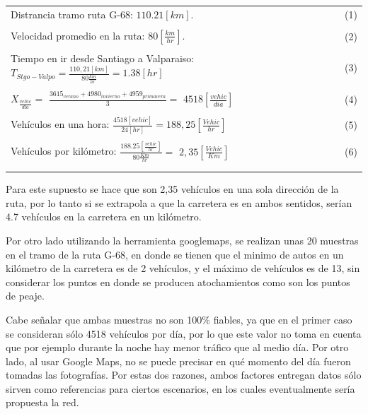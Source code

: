 \documentclass[12pt]{article}
\begin{document}
\begin{tabular}{ l  l }
Distrancia tramo ruta G-68: \qquad $110.21[km].$ & \footnotesize (1) \normalsize \\
\tiny  & \\ \normalsize
Velocidad promedio en la ruta: \qquad $80 [\frac{km}{hr}].$ & \footnotesize (2) \normalsize \\
\tiny & \\ \normalsize
Tiempo en ir desde Santiago a Valparaiso: $T_{Stgo-Valpo}= \frac{110,21 [km]}{80 \frac{km}{hr}}= 1.38[hr]$ &
\footnotesize (3) \normalsize \\ 
\tiny & \\ \normalsize
$X_{\frac{vehic}{día}}=$ \large $\frac{3615_{verano} + 4980_{invierno} + 4959_{primavera}}{3} = $
\normalsize $4518 [\frac{vehic}{dia}]$ & \footnotesize (4) \normalsize\\
\tiny & \\ \normalsize
Vehículos en una hora: \qquad \large $\frac{4518 [vehic]}{24 [hr]}=$\normalsize $188,25[\frac{Vehic}{hr}]$ & 
\footnotesize (5) \normalsize\\
\tiny & \\ \normalsize
Vehículos por kilómetro: \qquad \large $\frac{188.25 [\frac{vehic}{hr}]}{80 \frac{Km}{hr}} =$
\normalsize $2,35 [\frac{Vehic}{Km}]$ & \footnotesize (6) \normalsize \\
\tiny & \\ \normalsize
\end{tabular}

Para este supuesto se hace que son 2,35 vehículos en una sola dirección de la ruta, por lo tanto si se 
extrapola a que la carretera es en ambos sentidos, serían 4.7 vehículos en la carretera en un kilómetro.

Por otro lado utilizando la herramienta googlemaps, se realizan unas 20 muestras en el tramo de la ruta 
G-68, en donde se tienen que el minimo de autos en un kilómetro de la carretera es de 2 vehículos, y el 
máximo de vehículos es de 13, sin considerar los puntos en donde se producen atochamientos como son los 
puntos de peaje.

Cabe señalar que ambas muestras no son 100\% fiables, ya que en el primer caso se consideran sólo 4518 
vehículos por día, por lo que este valor no toma en cuenta que por ejemplo durante la noche hay menor 
tráfico que al medio día. Por otro lado, al usar Google Maps, no se puede precisar en qué momento del día 
fueron tomadas las fotografías. Por estas dos razones, ambos factores entregan datos sólo sirven como 
referencias para ciertos escenarios, en los cuales eventualmente sería propuesta la red.
\end{document}
